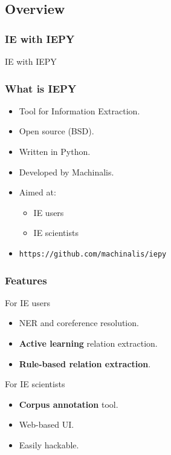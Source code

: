 \documentclass{beamer}
\begin{document}
\subsection{Overview}

\begin{frame}
\frametitle{IE with IEPY}
\huge{\centerline{IE with IEPY}}
\end{frame}

\begin{frame}
\frametitle{What is IEPY}

\begin{itemize}
\item Tool for Information Extraction.
\item Open source (BSD).
\item Written in Python.
\item Developed by Machinalis.
\item Aimed at:
\begin{itemize}
    \item IE users
    \item IE scientists
\end{itemize}
\item {\tt https://github.com/machinalis/iepy}
\end{itemize}
\end{frame}



\begin{frame}
\frametitle{Features}
    
\begin{block}{For IE users}
    \begin{itemize}
        \item NER and coreference resolution.
        \item {\bf Active learning} relation extraction.  %
        \item {\bf Rule-based relation extraction}. %
    \end{itemize}
\end{block}
\begin{block}{For IE scientists}
    \begin{itemize}
        \item {\bf Corpus annotation} tool.
        \item Web-based UI. %
        \item Easily hackable.  %
    \end{itemize}
\end{block}

\end{frame}
\end{document}
